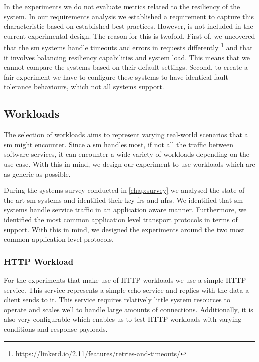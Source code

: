 In the experiments we do not evaluate metrics related to the resiliency of the system. In our requirements analysis we established a requirement to capture this characteristic based on established best practices. However, is not included in the current experimental design. The reason for this is twofold. First of, we uncovered that the \gls{sm} systems handle timeouts and errors in requests differently \footnote{\url{https://linkerd.io/2.11/features/retries-and-timeouts/}} and that it involves balancing resiliency capabilities and system load. This means that we cannot compare the systems based on their default settings. Second, to create a fair experiment we have to configure these systems to have identical fault tolerance behaviours, which not all systems support. 


\subsection{Workloads}
\label{sec:experiments:design:workloads}

The selection of workloads aims to represent varying real-world scenarios that a \gls{sm} might encounter. Since a \gls{sm} handles most, if not all the traffic between software services, it can encounter a wide variety of workloads depending on the use case. With this in mind, we design our experiment to use workloads which are as generic as possible. 

During the systems survey conducted in \cref{chap:survey} we analysed the state-of-the-art \gls{sm} systems and identified their key \glspl{fr} and \glspl{nfr}. We identified that \gls{sm} systems handle service traffic in an application aware manner. Furthermore, we identified the most common application level transport protocols in terms of support. With this in mind, we designed the experiments around the two most common application level protocols. 

\subsubsection{HTTP Workload}
\label{sec:experiments:design:workloads:http}

For the experiments that make use of HTTP workloads we use a simple HTTP service. This service represents a simple echo service and replies with the data a client sends to it. This service requires relatively little system resources to operate and scales well to handle large amounts of connections. Additionally, it is also very configurable which enables us to test HTTP workloads with varying conditions and response payloads.

